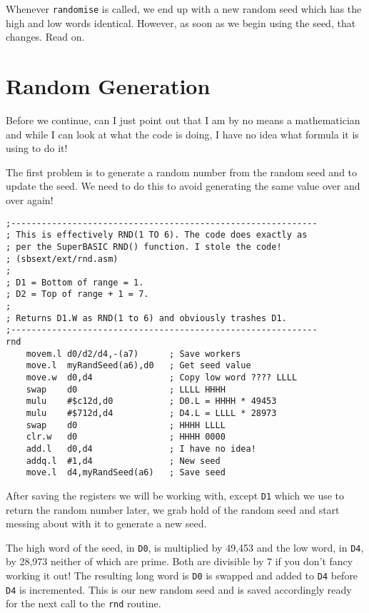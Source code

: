 Whenever \lstinline!randomise! is called, we end up with a new random
seed which has the high and low words identical. However, as soon
as we begin using the seed, that changes. Read on.

\section{Random Generation}

Before we continue, can I just point out that I am by no means a mathematician
and while I can look at what the code is doing, I have no idea what
formula it is using to do it! 

The first problem is to generate a random number from the random seed
and to update the seed. We need to do this to avoid generating the
same value over and over again!

\begin{lstlisting}[caption={Rnd 1 to 6 function - Part 1},firstnumber=49]
;------------------------------------------------------------
; This is effectively RND(1 TO 6). The code does exactly as
; per the SuperBASIC RND() function. I stole the code!
; (sbsext/ext/rnd.asm)
;
; D1 = Bottom of range = 1.
; D2 = Top of range + 1 = 7.
;
; Returns D1.W as RND(1 to 6) and obviously trashes D1.
;------------------------------------------------------------
rnd
    movem.l d0/d2/d4,-(a7)      ; Save workers
    move.l  myRandSeed(a6),d0   ; Get seed value
    move.w  d0,d4               ; Copy low word ???? LLLL
    swap    d0                  ; LLLL HHHH
    mulu    #$c12d,d0           ; D0.L = HHHH * 49453
    mulu    #$712d,d4           ; D4.L = LLLL * 28973
    swap    d0                  ; HHHH LLLL
    clr.w   d0                  ; HHHH 0000
    add.l   d0,d4               ; I have no idea!
    addq.l  #1,d4               ; New seed
    move.l  d4,myRandSeed(a6)   ; Save seed

\end{lstlisting}

After saving the registers we will be working with, except \lstinline!D1!
which we use to return the random number later, we grab hold of the
random seed and start messing about with it to generate a new seed. 

The high word of the seed, in \lstinline!D0!, is multiplied by 49,453
and the low word, in \lstinline!D4!, by 28,973 neither of which are
prime. Both are divisible by 7 if you don't fancy working it out!
The resulting long word is \lstinline!D0! is swapped and added to
\lstinline!D4! before \lstinline!D4! is incremented. This is our
new random seed and is saved accordingly ready for the next call to
the \lstinline!rnd! routine.

